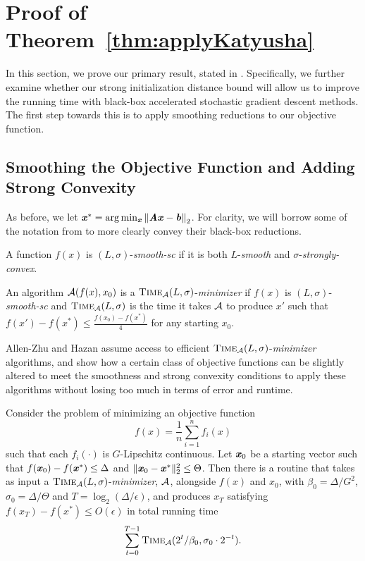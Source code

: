 \section{Proof of Theorem~\ref{thm:applyKatyusha}}\label{sec:katyushaproof}

In this section, we prove our primary result, stated in .
Specifically, we further examine whether our strong initialization distance bound will allow us to improve the running time with black-box accelerated stochastic gradient descent methods.
The first step towards this is to apply smoothing reductions to our objective function.

\subsection{Smoothing the Objective Function and Adding Strong Convexity}

As before, we let $\boldsymbol{\mathit{x}}^* = \arg\min_{\boldsymbol{\mathit{x}}} \left\| \boldsymbol{\mathit{A}}\boldsymbol{\mathit{x}} - \boldsymbol{\mathit{b}} \right\|_2$. For clarity, we will borrow some of the notation from \cite{AllenZhuH16} to more clearly convey their black-box reductions.%

\begin{definition}
	A function $f(x)$ is $(L,\sigma)$-\textit{smooth-sc} if it is both $L$-\textit{smooth} and $\sigma$-\textit{strongly-convex}.
\end{definition}

\begin{definition}
	An algorithm $\mathcal{A}(f(x),x_0)$ is a $\textsc{Time}_{\mathcal{A}}(L,\sigma)$-\textit{minimizer} if $f(x)$ is  $(L,\sigma)$-\textit{smooth-sc} and $\textsc{Time}_{\mathcal{A}}(L,\sigma)$ is the time it takes $\mathcal{A}$ to produce $x'$ such that $f(x') - f(x^*) \leq \frac{f(x_0) - f(x^*)}{4}$ for any starting $x_0$.
\end{definition}

Allen-Zhu and Hazan assume access to efficient $\textsc{Time}_{\mathcal{A}}(L,\sigma)$-\textit{minimizer} algorithms, and show how a certain class of objective functions can be slightly altered to meet the smoothness and strong convexity conditions to apply these algorithms without losing too much in terms of error and runtime.


\begin{theorem}\label{thm:reductionAlgo}
	Consider the problem of minimizing an objective function
	\[f(x) = \frac{1}{n}\sum_{i=1}^n f_i(x) \]
	such that each $f_i(\cdot)$ is $G$-Lipschitz continuous. Let $\boldsymbol{\mathit{x}}_0$ be a starting vector such that $f(\boldsymbol{\mathit{x}}_0) - f(\boldsymbol{\mathit{x}}^*) \leq \Delta$ and $\|\boldsymbol{\mathit{x}}_0 - \boldsymbol{\mathit{x}}^*\|_2^2 \leq \Theta$. 
	Then there is a routine that takes as input a $\textsc{Time}_{\mathcal{A}}(L,\sigma)$-\textit{minimizer}, $\mathcal{A}$, alongside $f(x)$ and $x_0$, with $\beta_0 = \Delta/G^2$, $\sigma_0 = \Delta/\Theta$ and $T = \log_2(\Delta/\epsilon)$, and produces $x_T$ satisfying $f(x_T) - f(x^*) \leq O(\epsilon)$ in total running time \[\sum_{t=0}^{T-1}\textsc{Time}_{\mathcal{A}}(2^t/\beta_0,\sigma_0\cdot 2^{-t}).\] 
\end{theorem}


